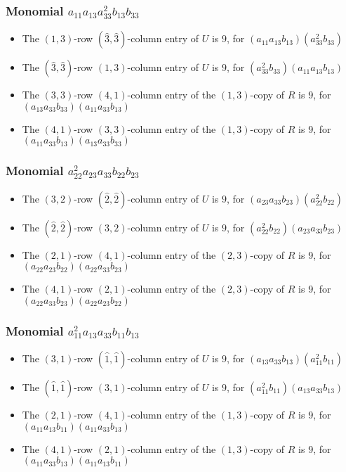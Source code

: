 \documentclass{article}
\begin{document}
\subsubsection{Monomial $ a_{11} a_{13} a_{33}^{2} b_{13} b_{33} $}

\begin{itemize}
\item The $ \left(1, 3\right) $-row $ (\hat{3}, \hat{3}) $-column entry of $U$ is $ 9 $, for $( a_{11} a_{13} b_{13} )( a_{33}^{2} b_{33} )$ 
\item The $(\hat{3}, \hat{3})$-row $ \left(1, 3\right) $-column entry of $U$ is $ 9 $, for $( a_{33}^{2} b_{33} )( a_{11} a_{13} b_{13} )$ 
\item The $(3, 3)$-row $(4, 1)$-column entry of the $ \left(1, 3\right) $-copy of $R$ is $ 9 $, for $( a_{13} a_{33} b_{33} )( a_{11} a_{33} b_{13} )$ 
\item The $(4, 1)$-row $(3, 3)$-column entry of the $ \left(1, 3\right) $-copy of $R$ is $ 9 $, for $( a_{11} a_{33} b_{13} )( a_{13} a_{33} b_{33} )$ 
\end{itemize}
\subsubsection{Monomial $ a_{22}^{2} a_{23} a_{33} b_{22} b_{23} $}

\begin{itemize}
\item The $ \left(3, 2\right) $-row $ (\hat{2}, \hat{2}) $-column entry of $U$ is $ 9 $, for $( a_{23} a_{33} b_{23} )( a_{22}^{2} b_{22} )$ 
\item The $(\hat{2}, \hat{2})$-row $ \left(3, 2\right) $-column entry of $U$ is $ 9 $, for $( a_{22}^{2} b_{22} )( a_{23} a_{33} b_{23} )$ 
\item The $(2, 1)$-row $(4, 1)$-column entry of the $ \left(2, 3\right) $-copy of $R$ is $ 9 $, for $( a_{22} a_{23} b_{22} )( a_{22} a_{33} b_{23} )$ 
\item The $(4, 1)$-row $(2, 1)$-column entry of the $ \left(2, 3\right) $-copy of $R$ is $ 9 $, for $( a_{22} a_{33} b_{23} )( a_{22} a_{23} b_{22} )$ 
\end{itemize}
\subsubsection{Monomial $ a_{11}^{2} a_{13} a_{33} b_{11} b_{13} $}

\begin{itemize}
\item The $ \left(3, 1\right) $-row $ (\hat{1}, \hat{1}) $-column entry of $U$ is $ 9 $, for $( a_{13} a_{33} b_{13} )( a_{11}^{2} b_{11} )$ 
\item The $(\hat{1}, \hat{1})$-row $ \left(3, 1\right) $-column entry of $U$ is $ 9 $, for $( a_{11}^{2} b_{11} )( a_{13} a_{33} b_{13} )$ 
\item The $(2, 1)$-row $(4, 1)$-column entry of the $ \left(1, 3\right) $-copy of $R$ is $ 9 $, for $( a_{11} a_{13} b_{11} )( a_{11} a_{33} b_{13} )$ 
\item The $(4, 1)$-row $(2, 1)$-column entry of the $ \left(1, 3\right) $-copy of $R$ is $ 9 $, for $( a_{11} a_{33} b_{13} )( a_{11} a_{13} b_{11} )$ 
\end{itemize}
\end{document}
